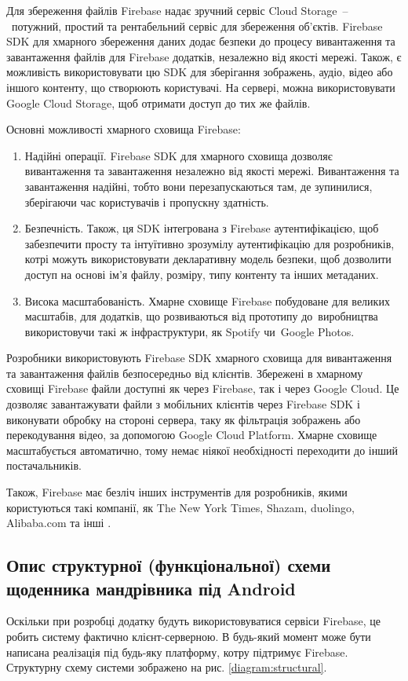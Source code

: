 \documentclass[../main.tex]{subfiles}
\begin{document}
Для збереження файлів Firebase надає зручний сервіс Cloud Storage~--~потужний, простий та рентабельний сервіс для збереження об'єктів. Firebase SDK для хмарного збереження даних додає безпеки до процесу вивантаження та завантаження файлів для Firebase додатків, незалежно від якості мережі. Також, є можливість використовувати цю SDK для зберігання зображень, аудіо, відео або іншого контенту, що створюють користувачі. На сервері, можна використовувати Google Cloud Storage, щоб отримати доступ до тих же файлів.

Основні можливості хмарного сховища Firebase:
\begin{enumerate}
	\item Надійні операції. Firebase SDK для хмарного сховища дозволяє вивантаження та завантаження незалежно від якості мережі. Вивантаження та завантаження надійні, тобто вони перезапускаються там, де зупинилися, зберігаючи час користувачів і пропускну здатність.
	\item Безпечність. Також, ця SDK інтегрована з Firebase аутентифікацією, щоб забезпечити просту та інтуїтивно зрозумілу аутентифікацію для розробників, котрі можуть використовувати декларативну модель безпеки, щоб дозволити доступ на основі ім'я файлу, розміру, типу контенту та інших метаданих.
	\item Висока масштабованість. Хмарне сховище Firebase побудоване для великих масштабів, для додатків, що розвиваються від прототипу до~виробництва використовучи такі ж інфраструктури, як Spotify чи~Google Photos.
\end{enumerate}

Розробники використовують Firebase SDK хмарного сховища для вивантаження та завантаження файлів безпосередньо від клієнтів. Збережені в хмарному сховищі Firebase файли доступні як через Firebase, так і через Google Cloud. Це дозволяє завантажувати файли з мобільних клієнтів через Firebase SDK і виконувати обробку на стороні сервера, таку як фільтрація зображень або перекодування відео, за допомогою Google Cloud Platform. Хмарне сховище масштабується автоматично, тому немає ніякої необхідності переходити до інший постачальників.

Також, Firebase має безліч інших інструментів для розробників, якими користуються такі компанії, як The New York Times, Shazam, duolingo, Alibaba.com та інші \cite{firebase}.

\subsection{Опис структурної (функціональної) схеми щоденника мандрівника під Android} %
Оскільки при розробці додатку будуть використовуватися сервіси Firebase, це робить систему фактично клієнт-серверною. В будь-який момент може бути написана реалізація під будь-яку платформу, котру підтримує Firebase. Структурну схему системи зображено на рис. \ref{diagram:structural}.
\end{document}
